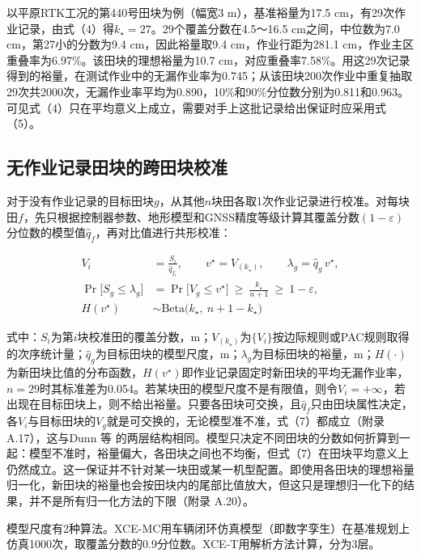 \documentclass[preprint,12pt,number,sort&compress]{elsarticle}
\begin{document}
以平原RTK工况的第440号田块为例（幅宽3 m），基准裕量为17.5 cm，有29次作业记录，由式（4）得\(k_\star=27\)。29个覆盖分数在4.5～16.5 cm之间，中位数为7.0 cm，第27小的分数为9.4 cm，因此裕量取9.4 cm，作业行距为281.1 cm，作业主区重叠率为6.97\%。该田块的理想裕量为10.7 cm，对应重叠率7.58\%。用这29次记录得到的裕量，在测试作业中的无漏作业率为0.745；从该田块200次作业中重复抽取29次共2000次，无漏作业率平均为0.890，10\%和90\%分位数分别为0.811和0.963。可见式（4）只在平均意义上成立，需要对手上这批记录给出保证时应采用式（5）。

\subsection{无作业记录田块的跨田块校准}

对于没有作业记录的目标田块\(g\)，从其他\(n\)块田各取1次作业记录进行校准。对每块田\(f\)，先只根据控制器参数、地形模型和GNSS精度等级计算其覆盖分数\((1-\varepsilon)\)分位数的模型值\(\hat q_f\)，再对比值进行共形校准：

\begin{equation}
\begin{aligned}
V_i&=\frac{S_i}{\hat q_{f_i}},\qquad v^\star=V_{(k_\star)},\qquad \lambda_g=\hat q_g\,v^\star,\\
\Pr\big[S_g\le\lambda_g\big]&=\Pr\big[V_g\le v^\star\big]\ \ge\ \frac{k_\star}{n+1}\ \ge\ 1-\varepsilon,\\
H(v^\star)&\sim\mathrm{Beta}\big(k_\star,\ n+1-k_\star\big)
\end{aligned}
\end{equation}

式中：\(S_i\)为第\(i\)块校准田的覆盖分数，m；\(V_{(k_\star)}\)为\(\{V_i\}\)按边际规则或PAC规则取得的次序统计量；\(\hat q_g\)为目标田块的模型尺度，m；\(\lambda_g\)为目标田块的裕量，m；\(H(\cdot)\)为新田块比值的分布函数，\(H(v^\star)\)即作业记录固定时新田块的平均无漏作业率，\(n=29\)时其标准差为0.054。若某块田的模型尺度不是有限值，则令\(V_i=+\infty\)，若出现在目标田块上，则不给出裕量。只要各田块可交换，且\(\hat q_f\)只由田块属性决定，各\(V_i\)与目标田块的\(V_g\)就是可交换的，无论模型准不准，式（7）都成立（附录 A.17），这与Dunn 等\citep{dunn2023} 的两层结构相同。模型只决定不同田块的分数如何折算到一起：模型不准时，裕量偏大，各田块之间也不均衡，但式（7）在田块平均意义上仍然成立。这一保证并不针对某一块田或某一机型配置。即使用各田块的理想裕量归一化，新田块的裕量也会按田块内的尾部比值放大，但这只是理想归一化下的结果，并不是所有归一化方法的下限（附录 A.20）。

模型尺度有2种算法。XCE-MC用车辆闭环仿真模型（即数字孪生）在基准规划上仿真1000次，取覆盖分数的0.9分位数。XCE-T用解析方法计算，分为3层。
\end{document}
